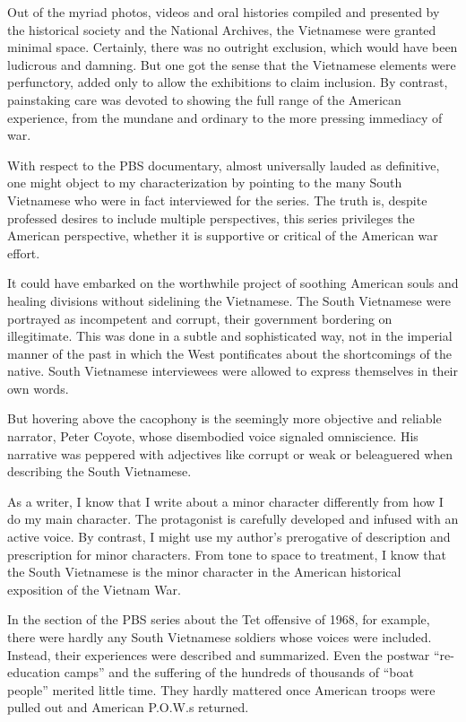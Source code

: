 Out of the myriad photos, videos and oral histories compiled and
presented by the historical society and the National Archives, the
Vietnamese were granted minimal space. Certainly, there was no outright
exclusion, which would have been ludicrous and damning. But one got the
sense that the Vietnamese elements were perfunctory, added only to allow
the exhibitions to claim inclusion. By contrast, painstaking care was
devoted to showing the full range of the American experience, from the
mundane and ordinary to the more pressing immediacy of war.

With respect to the PBS documentary, almost universally lauded as
definitive, one might object to my characterization by pointing to the
many South Vietnamese who were in fact interviewed for the series. The
truth is, despite professed desires to include multiple perspectives,
this series privileges the American perspective, whether it is
supportive or critical of the American war effort.

It could have embarked on the worthwhile project of soothing American
souls and healing divisions without sidelining the Vietnamese. The South
Vietnamese were portrayed as incompetent and corrupt, their government
bordering on illegitimate. This was done in a subtle and sophisticated
way, not in the imperial manner of the past in which the West
pontificates about the shortcomings of the native. South Vietnamese
interviewees were allowed to express themselves in their own words.

But hovering above the cacophony is the seemingly more objective and
reliable narrator, Peter Coyote, whose disembodied voice signaled
omniscience. His narrative was peppered with adjectives like corrupt or
weak or beleaguered when describing the South Vietnamese.

As a writer, I know that I write about a minor character differently
from how I do my main character. The protagonist is carefully developed
and infused with an active voice. By contrast, I might use my author's
prerogative of description and prescription for minor characters. From
tone to space to treatment, I know that the South Vietnamese is the
minor character in the American historical exposition of the Vietnam
War.

In the section of the PBS series about the Tet offensive of 1968, for
example, there were hardly any South Vietnamese soldiers whose voices
were included. Instead, their experiences were described and summarized.
Even the postwar ``re-education camps'' and the suffering of the
hundreds of thousands of ``boat people'' merited little time. They
hardly mattered once American troops were pulled out and American
P.O.W.s returned.

